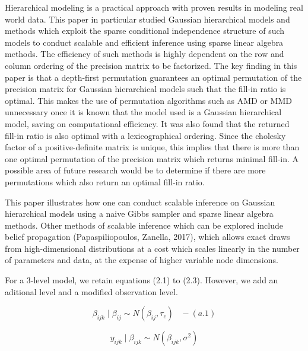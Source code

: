 \documentclass[]{article}
\begin{document}
Hierarchical modeling is a practical approach with proven results in
modeling real world data. This paper in particular studied Gaussian
hierarchical models and methods which exploit the sparse conditional
independence structure of such models to conduct scalable and efficient
inference using sparse linear algebra methods. The efficiency of such
methods is highly dependent on the row and column ordering of the
precision matrix to be factorized. The key finding in this paper is that
a depth-first permutation guarantees an optimal permutation of the
precision matrix for Gaussian hierarchical models such that the fill-in
ratio is optimal. This makes the use of permutation algorithms such as
AMD or MMD unnecessary once it is known that the model used is a
Gaussian hierarchical model, saving on computational efficiency. It was
also found that the returned fill-in ratio is also optimal with a
lexicographical ordering. Since the cholesky factor of a
positive-definite matrix is unique, this implies that there is more than
one optimal permutation of the precision matrix which returns minimal
fill-in. A possible area of future research would be to determine if
there are more permutations which also return an optimal fill-in ratio.

This paper illustrates how one can conduct scalable inference on
Gaussian hierarchical models using a naive Gibbs sampler and sparse
linear algebra methods. Other methods of scalable inference which can be
explored include belief propagation (Papaspiliopoulos, Zanella, 2017),
which allows exact draws from high-dimensional distributions at a cost
which scales linearly in the number of parameters and data, at the
expense of higher variable node dimensions.

\newpage

 \newline \newline \newline
{} \newline 

For a 3-level model, we retain equations (2.1) to (2.3). However, we add
an aditional level and a modified observation level.

\[\beta_{ijk} \;|\; \beta_{ij} \sim N( \beta_{ij}, \tau_c) \;\;\; - (a.1)\]

\[y_{ijk} \;|\; \beta_{ijk} \sim N( \beta_{ijk}, \sigma^2)\]
\newline \newline \newline
\end{document}
